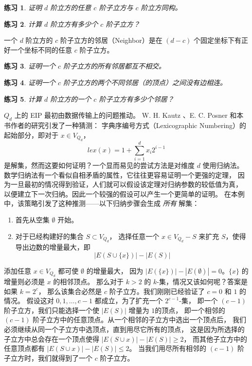 \documentclass[12pt, a4paper]{article}
\newtheorem{exercise}{练习}
\begin{document}
\begin{exercise}
\label{Exercise 3}
证明 $d$ 阶立方的任意 $c$ 阶子立方与 $c$ 阶立方同构。
\end{exercise}

\begin{exercise}
\label{Exercise 4}
计算 $d$ 阶立方有多少个 $c$ 阶子立方？
\end{exercise}

一个 $d$ 阶立方的 $c$ 阶子立方的邻居（Neighbor）是在 $(d − c)$
个固定坐标下有正好一个坐标不同的任意 $c$ 阶子立方。

\begin{exercise}
\label{Exercise 5}
证明一个 $c$ 阶子立方的所有邻居都互不相交。
\end{exercise}

\begin{exercise}
\label{Exercise 6}
证明一个 $c$ 阶子立方的两个不同邻居（的顶点）之间没有边相连。
\end{exercise}

\begin{exercise}
\label{Exercise 7}
计算 $d$ 阶立方的一个 $c$ 阶子立方有多少个邻居？
\end{exercise}

$Q_d$ 上的 EIP 最初由数据传输上的问题推动。
W. H. Kautz \cite{Kautz.1954}、E. C. Posner 和本书作者的研究引发了一种猜测：
字典序编号方式（Lexicographic Numbering）的起始部分，即对于 $x \in V_{Q_d}$，
\begin{equation*}
lex(x) = 1 + \sum_{i = 1}^d x_i 2^{i - 1}
\end{equation*}
是解集，然而这要如何证明？一个显而易见的尝试方法是对维度 $d$ 使用归纳法。
数学归纳法有一个看似自相矛盾的属性，它往往更容易证明一个更强的定理，
因为一旦最初的情况得到验证，人们就可以假设该定理对归纳参数的较低值为真，
以便建立下一次归纳。因此一个较强的假设可以产生一个更简单的证明。
在本例中，该策略引发了这种推测——以下归纳步骤会生成 \emph{所有} 解集：

\begin{enumerate}[(1)]
	\item 首先从空集 $\emptyset$ 开始。
	\item 对于已经构建好的集合 $S \subset V_{Q_d}$，
		选择任意一个 $x \in V_{Q_d} − S$ 来扩充 $S$，使得导出边数的增量最大，即
		\begin{equation*}
		|E(S \cup \{x\})| − |E(S)|
		\end{equation*}
\end{enumerate}

添加任意 $x \in V_{Q_d}$ 都可使 $\emptyset$ 的增量最大，
因为 $|E(\{x\})| − |E(\emptyset)| = 0$。$\{x\}$ 的增量则必须是 $x$ 的相邻顶点。
那么对于 $k > 2$ 的 $k$-集，情况又该如何呢？答案是如果 $k = 2^c$，
那么该集合必然是 $c$ 阶子立方。我们刚刚已经验证了 $c = 0$ 和 $1$ 的情况。
假设这对 $0, 1, \dots, c − 1$ 都成立，为了扩充一个 $2^{c − 1}$-集，
即一个 $(c − 1)$ 阶子立方，我们只能选择一个使 $|E(S)|$ 增量为 $1 $的顶点，
即一个相邻的 $(c − 1)$ 阶子立方中的任意顶点。从一个相邻的子立方中选出一个顶点后，
我们必须继续从同一个子立方中选顶点，直到用尽它所有的顶点，
这是因为所选择的子立方中总会存在一个顶点使得 $|E(S \cup {x})| − |E(S)| \ge 2$，
而其他子立方中的任意顶点都有 $|E(S \cup {x})| − |E(S)| \le 2$。
当我们用尽所有相邻的 $(c − 1)$ 阶子立方时，我们就得到了一个 $c$ 阶子立方。
\end{document}
